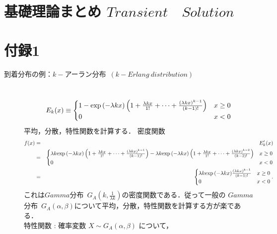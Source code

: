 \documentclass[a4j,papersize,disablejfam,slide,14pt]{jsarticle}
\def\exp#1{\mbox{${\rm exp} \left( #1 \right)$}} %
\begin{document}
\newpage
\section{基礎理論まとめ \qquad $Transient\quad Solution$}


\scriptsize
\newpage
\section{付録1}
	\begin{description}
    	\item[到着分布の例：$k-$アーラン分布\ $(k-Erlang\ distribution)$]\mbox{}\\
    		\begin{equation}
    			E_k(x) \equiv
        		\begin{cases}
        			1 - \exp{-\lambda k x} \left( 1 + \frac{\lambda k x}{1!} + \cdots + \frac{(\lambda k x)^{k-1}}{(k-1)!} \right) & \text{$x \geq 0$}\\
    				0 & \text{$x < 0$}
        		\end{cases}
    		\end{equation}
        平均，分散，特性関数を計算する．
        密度関数
        \begin{eqnarray}
            f(x) &=& E_k'(x) \\&=& 
            \begin{cases}
        			\lambda k \exp{-\lambda k x} \left( 1 + \frac{\lambda k x}{1!} + \cdots + \frac{(\lambda k x)^{k-1}}{(k-1)!} \right)
                    - \lambda k \exp{-\lambda k x} \left( 1 + \frac{\lambda k x}{1!} + \cdots + \frac{(\lambda k x)^{k-2}}{(k-2)!} \right) & \text{$x \geq 0$}\\
    				0 & \text{$x < 0$}
        	\end{cases} 
            \\&=&
            \begin{cases}
        			\lambda k \exp{-\lambda k x} \frac{(\lambda k x)^{k-1}}{(k-1)!} & \text{$x \geq 0$}\\
    				0 & \text{$x < 0$}
        	\end{cases}.
        \end{eqnarray}
        これは$Gamma$分布\ $G_A(k, \frac{1}{\lambda k})$の密度関数である．従って一般の
        $Gamma$分布\ $G_A(\alpha, \beta)$について平均，分散，特性関数を計算する方が楽である．\\
        特性関数 : 確率変数 $X \sim G_A(\alpha, \beta)$ について，
        \begin{eqnarray}

\end{eqnarray}
\end{description}
\end{document}
